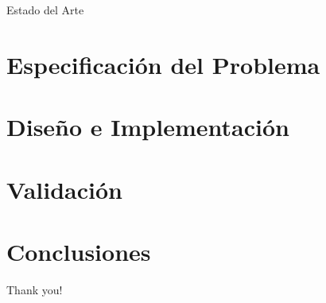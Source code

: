 \documentclass{beamer}
\begin{document}
\begin{frame}{Estado del Arte}
\end{frame}
    
\section{Especificación del Problema}
\section{Diseño e Implementación}
\section{Validación}
\section{Conclusiones}
\begin{frame}[standout]
    Thank you!
\end{frame}

\begin{frame}[t,allowframebreaks]
    \printbibliography
\end{frame}
\end{document}

